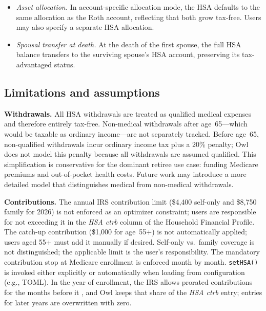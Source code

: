 \documentclass[fleqn,12pt]{report}
\begin{document}
\begin{itemize}[nosep]
    heirs' assumed marginal income tax rate, identical to the treatment of
    tax-deferred accounts.
    A surviving spouse inherits the HSA intact with no tax (the full balance
    transfers to their own HSA), but a non-spouse beneficiary must include
    the full amount in ordinary income.
    The reported estate value applies the same discount.
  \item \textit{Asset allocation.}
    In account-specific allocation mode, the HSA defaults to the same
    allocation as the Roth account, reflecting that both grow tax-free.
    Users may also specify a separate HSA allocation.
  \item \textit{Spousal transfer at death.}
    At the death of the first spouse, the full HSA balance transfers to the
    surviving spouse's HSA account, preserving its tax-advantaged status.
\end{itemize}

\subsection*{Limitations and assumptions}

\textbf{Withdrawals.}
All HSA withdrawals are treated as qualified medical expenses and therefore
entirely tax-free.
Non-medical withdrawals after age~65---which would be taxable as ordinary
income---are not separately tracked.
Before age~65, non-qualified withdrawals incur ordinary income tax plus a
20\% penalty; Owl does not model this penalty because all withdrawals are
assumed qualified.
This simplification is conservative for the dominant retiree use case:
funding Medicare premiums and out-of-pocket health costs.
Future work may introduce a more detailed model that distinguishes medical
from non-medical withdrawals.

\textbf{Contributions.}
The annual IRS contribution limit (\$4,400 self-only and \$8,750 family for
2026) is not enforced as an optimizer constraint; users are responsible for
not exceeding it in the \textit{HSA ctrb} column of the Household Financial
Profile.
The catch-up contribution (\$1,000 for age~55+) is not automatically applied;
users aged 55+ must add it manually if desired.
Self-only vs.\ family coverage is not distinguished; the applicable limit is
the user's responsibility.
The mandatory contribution stop at Medicare enrollment is enforced month by month.
\texttt{setHSA()} is invoked either
explicitly or automatically when loading from configuration (e.g., TOML).
In the year of enrollment, the IRS allows prorated contributions for the months
before it \cite{irs8889}, and Owl keeps that share of the \textit{HSA ctrb}
entry; entries for later years are overwritten with zero.
\end{document}

